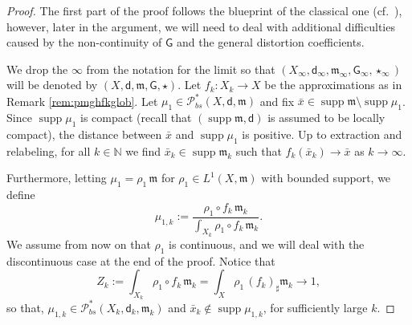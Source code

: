 \documentclass[11pt,a4paper]{article}
\theoremstyle{plain}
\theoremstyle{definition}
\theoremstyle{remark}
\numberwithin{equation}{section}
\newcommand{\N}{\mathbb{N}} %
\DeclareMathOperator{\supp}{\mathrm{supp}}
\newcommand{\Prob}{\mathcal{P}}
\newcommand{\mm}{\mathfrak m}
\newcommand{\sfd}{\mathsf d}
\newcommand{\sfG}{\mathsf G}
\begin{document}
\begin{proof}
The first part of the proof follows the blueprint of the classical one (cf.\ \cite{Vil}), however, later in the argument,  we will need to deal with additional difficulties caused by  the non-continuity of $\sfG$ and the general distortion coefficients.

We drop the $\infty$ from the notation for the limit so that $(X_\infty,\sfd_\infty,\mm_\infty,\sfG_\infty,\star_\infty)$ will be denoted by $(X,\sfd,\mm,\sfG,\star)$. 
Let $f_k :X_k \to X$ be the approximations as in Remark \ref{rem:pmghfkglob}. 
Let $\mu_1 \in \Prob_{bs}^{*}(X,\sfd,\mm)$  and fix $\bar{x} \in \supp\mm \setminus \supp \mu_1$.  Since $\supp \mu_1$ is compact (recall that $(\supp\mm,\sfd)$ is assumed to be locally compact), the distance between $\bar{x}$ and $\supp \mu_1$ is positive. Up to extraction and relabeling, for all $k\in \N$ we find $\bar{x}_k\in \supp\mm_k$ such that $f_k(\bar{x}_k)\to \bar{x}$ as $k\to \infty$.


Furthermore, letting $\mu_1 = \rho_1\, \mm$ for $\rho_1 \in L^1(X,\mm)$ with bounded support, we define
\begin{equation}
\mu_{1,k}:=\frac{\rho_1 \circ f_k \, \mm_k}{\int_{X_k} \rho_1 \circ f_k\, \mm_k}.
\end{equation}
We assume from now on that $\rho_1$ is continuous, and we will deal with the discontinuous case at the end of the proof. Notice that 
\begin{equation}
Z_k:=\int_{X_k} \rho_1 \circ f_k \, \mm_k = \int_{X}\rho_1 \, (f_k)_\sharp \mm_k \to 1,
\end{equation}
so that, $\mu_{1,k}\in \Prob_{bs}^{*}(X_{k},\sfd_{k},\mm_{k})$  and $\bar{x}_k\notin \supp  \mu_{1,k}$, for sufficiently large $k$.


\end{proof}
\end{document}
